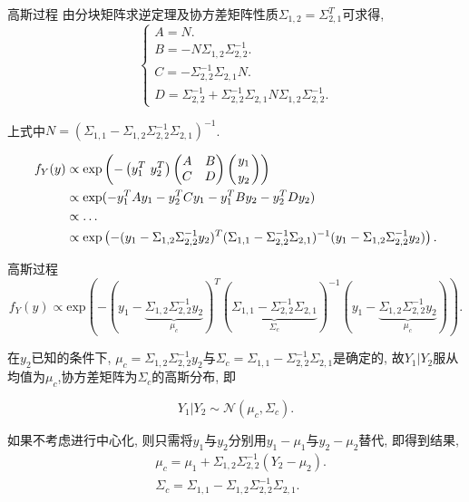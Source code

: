 \begin{frame}[fragile]{高斯过程}
    由分块矩阵求逆定理及协方差矩阵性质$\Sigma_{1,2}=\Sigma^{T}_{2,1}$可求得, 
    \begin{equation}
        \begin{cases}
            A=N. \\
            B=-N\Sigma_{1,2}\Sigma_{2,2}^{-1}. \\ 
            C=-\Sigma_{2,2}^{-1}\Sigma_{2,1}N. \\
            D=\Sigma_{2,2}^{-1}+\Sigma_{2,2}^{-1}\Sigma_{2,1}N\Sigma_{1,2}\Sigma_{2,2}^{-1}. 
        \end{cases} 
    \end{equation}

    上式中$N=(\Sigma_{1,1}-\Sigma_{1,2}\Sigma^{-1}_{2,2}\Sigma_{2,1})^{-1}$.

    \begin{align}\label{A.10}
        f_{Y}(y)&\propto\mathrm{exp}\left( -\left(y^{T}_{1}\ y^{T}_{2}\right)
        \begin{pmatrix}
            A & B \\
            C & D \\
        \end{pmatrix}
        \left({y_{1}\atop y_{2}}\right)\right)\notag\\
        &\propto\mathrm{exp}(-y^{T}_{1}Ay_{1}-y^{T}_{2}Cy_{1}-y^{T}_{1}By_{2}-y^{T}_{2}Dy_{2} )\notag \\
        &\propto\dots \\ 
        &\propto\mathrm{exp}\left(-(y_{1}-\Sigma_{1,2}\Sigma^{-1}_{2,2}y_{2})^{T}(\Sigma_{1,1}-\Sigma^{-1}_{2,2}\Sigma_{2,1})^{-1}(y_{1}-\Sigma_{1,2}\Sigma^{-1}_{2,2}y_{2})\right). \notag
    \end{align}

\end{frame}

\begin{frame}[fragile]{高斯过程}
    $$f_{Y}(y)\propto\mathrm{exp}\left(-(y_{1}-\underbrace{\Sigma_{1,2}\Sigma^{-1}_{2,2}y_{2}}_{\mu_{c}})^{T}(\underbrace{\Sigma_{1,1}-\Sigma^{-1}_{2,2}\Sigma_{2,1}}_{\Sigma_{c}})^{-1}(y_{1}-\underbrace{\Sigma_{1,2}\Sigma^{-1}_{2,2}y_{2}}_{\mu_{c}})\right).$$

    在$y_{2}$已知的条件下, $\mu_{c}=\Sigma_{1,2}\Sigma^{-1}_{2,2}y_{2}$与$\Sigma_{c}=\Sigma_{1,1}-\Sigma^{-1}_{2,2}\Sigma_{2,1}$是确定的, 故$Y_{1}|Y_{2}$服从均值为$\mu_{c}$,协方差矩阵为$\Sigma_{c}$的高斯分布, 即

    $$Y_{1}|Y_{2}\sim\mathcal{N}(\mu_{c},\Sigma_{c}).$$

    如果不考虑进行中心化, 则只需将$y_{1}$与$y_{2}$分别用$y_{1}-\mu_{1}$与$y_{2}-\mu_{2}$替代, 即得到结果,
    \begin{align*}
        &\mu_{c}=\mu_{1}+\Sigma_{1,2}\Sigma_{2,2}^{-1}(Y_{2}-\mu_{2}). \\
        &\Sigma_{c}=\Sigma_{1,1}-\Sigma_{1,2}\Sigma^{-1}_{2,2}\Sigma_{2,1}.
    \end{align*}
    \rightline{$\square$} %
\end{frame}

